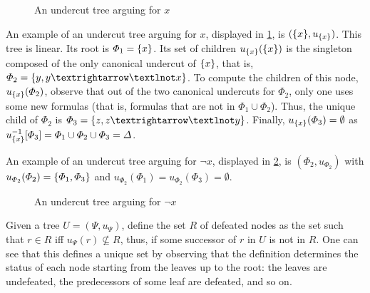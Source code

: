 \documentclass[version=3.21, pagesize, twoside=off, bibliography=totoc, DIV=calc, fontsize=12pt, a4paper, french, english]{scrartcl}
\begin{document}
\begin{figure}
	\caption{An undercut tree arguing for $x$}
	\label{fig:utx}
\end{figure}
\begin{example}
	\label{ex:abstUnder}
	An example of an undercut tree arguing for $x$, displayed in \cref{fig:utx}, is $(\{x\}, u_{\{x\}})$. This tree is linear. Its root is $\Phi_1 = \{x\}$. Its set of children $u_{\{x\}}(\{x\})$ is the singleton composed of the only canonical undercut of $\{x\}$, that is, $\Phi_2 = \set{y, y → ¬x}$. 
	To compute the children of this node, $u_{\{x\}}(\Phi_2)$, observe that out of the two canonical undercuts for $\Phi_2$, only one uses some new formulas (that is, formulas that are not in $\Phi_1 \cup \Phi_2$). Thus, the unique child of $\Phi_2$ is $\Phi_3 = \set{z, z → ¬y}$. 
	Finally, $u_{\{x\}}(\Phi_3) = \emptyset$ as $u_{\{x\}}^{-1}[\Phi_3] = \Phi_1 \cup \Phi_2 \cup \Phi_3 = \Delta$.
	
	An example of an undercut tree arguing for $¬x$, displayed in \cref{fig:utnx}, is $(\Phi_2, u_{\Phi_2})$ with $u_{\Phi_2}(\Phi_2) = \{\Phi_1, \Phi_3\}$ and $u_{\Phi_2}(\Phi_1) = u_{\Phi_2}(\Phi_3) = \emptyset$.
\end{example}
\begin{figure}
	\caption{An undercut tree arguing for $¬x$}
	\label{fig:utnx}
\end{figure}

Given a tree $U = (\Psi, u_\Psi)$, define the set $R$ of defeated nodes as the set such that $r \in R$ iff $u_\Psi(r) \nsubseteq R$, thus, if some successor of $r$ in $U$ is not in $R$.
One can see that this defines a unique set by observing that the definition determines the status of each node starting from the leaves up to the root: the leaves are undefeated, the predecessors of some leaf are defeated, and so on.
\end{document}
